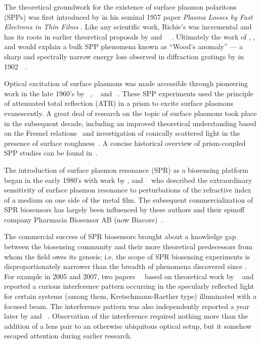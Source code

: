The theoretical groundwork for the existence of surface plasmon polaritons
(SPPs) was first introduced by  in his seminal 1957 paper
\textit{Plasma Losses by Fast Electrons in Thin Films}
\cite{ritchie1957plasma}.  Like any scientific work, Richie's was
incremental and has its roots in earlier theoretical proposals by
 and
~\cite{bohm1951collective}~\cite{pines1952collective}.
Ultimately the work of , , and  would
explain a bulk SPP phenomena known as ``Wood's anomaly'' --- a sharp and
spectrally narrow energy loss observed in diffraction gratings by
 in
1902~\cite{wood1902remarkable}~\cite{rayleigh1907remarkable}.

Optical excitation of surface plasmons was made accessible through
pioneering work in the late 1960's by
~\cite{kretschmann1968},
~\cite{raether1988springer} and
~\cite{otto1968excitation}.  These SPP experiments used the
principle of attenuated total reflection (ATR) in a prism to excite surface
plasmons evanescently.  A great deal of research on the topic of surface
plasmons took place in the subsequent decade, including an improved
theoretical understanding based on the Fresnel
relations~\cite{chen1976excitation} and investigation of conically scattered
light in the presence of surface roughness~\cite{simon1976directional}.  A
concise historical overview of prism-coupled SPP studies can be found
in~\cite{raether1997surface}.

The introduction of surface plasmon resonance (SPR) as a biosensing platform
began in the early 1980's with work by ,  and
~\cite{liedberg1983surface} who described the extraordinary
sensitivity of surface plasmon resonance to perturbations of the refractive
index of a medium on one side of the metal film.  The subsequent
commercialization of SPR biosensors has largely been influenced by these
authors and their spinoff company Pharmacia Biosensor AB (now
Biacore)~\cite{liedberg1995biosensing}.

The commercial success of SPR biosensors brought about a knowledge gap between
the biosensing community and their more theoretical predecessors from whom the
field owes its genesis; i.e\@. the scope of SPR biosensing experiments is
disproportionately narrower than the breadth of phenomena discovered since
.  For example in 2005 and 2007, two
papers~\cite{andaloro2005optical}~\cite{simon2007observation} based on
theoretical work by ~\cite{chuang1986lateral} and 
\cite{chen1976excitation} reported a curious interference pattern occurring in
the specularly reflected light for certain systems (among them,
Kretschmann-Raether type) illuminated with a focused beam.  The interference
pattern was also independently reported a year later by  and
~\cite{schumann2008near}.  Observation of the interference
required nothing more than the addition of a lens pair to an otherwise
ubiquitous optical setup, but it somehow escaped attention during earlier
research.


